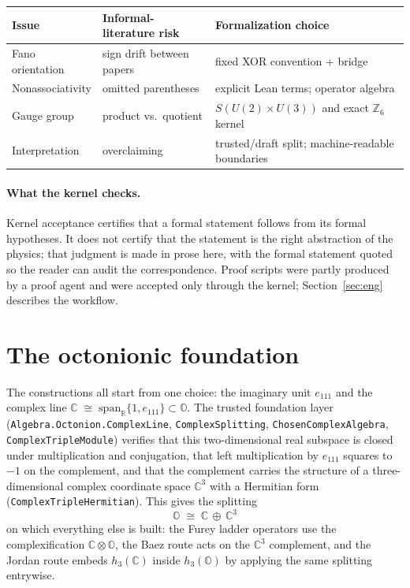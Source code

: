 \documentclass[11pt]{article}
\newcommand{\C}{\mathbb{C}}
\newcommand{\R}{\mathbb{R}}
\newcommand{\OO}{\mathbb{O}}
\newcommand{\leanname}[1]{\texttt{#1}}
\begin{document}
\begin{center}
\begin{tabular}{lll}
\toprule
Issue & Informal-literature risk & Formalization choice \\
\midrule
Fano orientation & sign drift between papers & fixed XOR convention + bridge \\
Nonassociativity & omitted parentheses & explicit Lean terms; operator algebra \\
Gauge group & product vs.\ quotient & $S(U(2)\times U(3))$ and exact
$\mathbb{Z}_6$ kernel \\
Interpretation & overclaiming & trusted/draft split; machine-readable
boundaries \\
\bottomrule
\end{tabular}
\end{center}

\paragraph{What the kernel checks.}  Kernel acceptance certifies that a
formal statement follows from its formal hypotheses.  It does not certify
that the statement is the right abstraction of the physics; that judgment
is made in prose here, with the formal statement quoted so the reader can
audit the correspondence.  Proof scripts were partly produced by a proof
agent and were accepted only through the kernel; Section~\ref{sec:eng}
describes the workflow.

\section{The octonionic foundation}
\label{sec:foundation}

The constructions all start from one choice: the imaginary unit
$e_{111}$ and the complex line
$\C \;\cong\; \mathrm{span}_\R\{1, e_{111}\} \subset \OO$.
The trusted foundation layer (\leanname{Algebra.Octonion.ComplexLine},
\leanname{ComplexSplitting}, \leanname{ChosenComplexAlgebra},
\leanname{ComplexTripleModule}) verifies that this two-dimensional real
subspace is closed under multiplication and conjugation, that left
multiplication by $e_{111}$ squares to $-1$ on the complement, and that
the complement carries the structure of a three-dimensional complex
coordinate space $\C^3$ with a Hermitian form
(\leanname{ComplexTripleHermitian}).  This gives the splitting
\[
\OO \;\cong\; \C \,\oplus\, \C^3
\]
on which everything else is built: the Furey ladder operators use the
complexification $\C\otimes\OO$, the Baez route acts on the $\C^3$
complement, and the Jordan route embeds $h_3(\C)$ inside $h_3(\OO)$ by
applying the same splitting entrywise.
\end{document}
